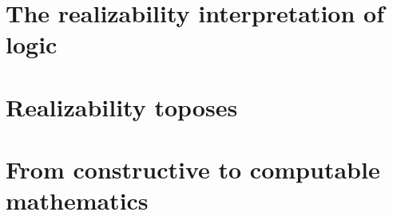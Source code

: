 \section{The realizability interpretation of logic}
\label{sec:realizability-interpretation}

\section{Realizability toposes}
\label{sec:realizability-toposes}

\section{From constructive to computable mathematics}
\label{sec:constructive-math}



